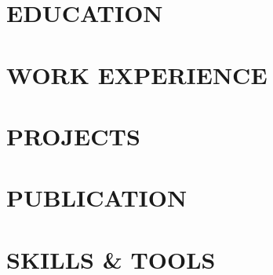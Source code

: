 \documentclass[11pt,letterpaper]{article}
\begin{document}

\section{EDUCATION}

\section{WORK EXPERIENCE}

\section{PROJECTS}



\section{PUBLICATION}

\section{SKILLS \& TOOLS}

\end{document}
